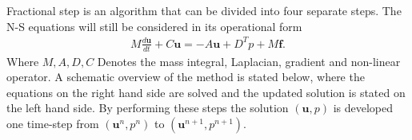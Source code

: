 Fractional step is an algorithm that can be divided into four separate steps. The N-S equations will still 
be considered in its operational form 
\begin{align}
    M\frac{d \mathbf{u}}{dt} + C\mathbf{u} = -A\mathbf{u} +D^T p +M\mathbf{f}.
    \label{eq:NSfracstep}
\end{align}
%
Where $M, A,D,C$ Denotes the mass integral, Laplacian, gradient and non-linear operator. 
A schematic overview of the method is stated below, where the equations on the right hand side are 
solved and the updated solution is stated on the left hand side. By performing these 
steps the solution $(\mathbf{u},p)$ is developed one time-step
from $(\mathbf{u}^n,p^n)$ to $(\mathbf{u}^{n+1},p^{n+1})$. 
